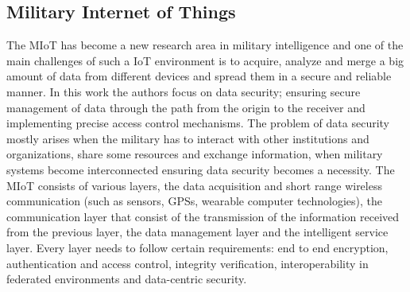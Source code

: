 \subsection{Military Internet of Things}
The MIoT has become a new research area in military intelligence and one of the main challenges of such a IoT environment is to acquire, analyze and merge a big amount of data from different devices and spread them in a secure and reliable manner. 
In this work \cite{s24185863} the authors focus on data security; ensuring secure management of data through the path from the origin to the receiver and implementing precise access control mechanisms.
The problem of data security mostly arises when the military has to interact with other institutions and organizations, share some resources and exchange information, when military systems become interconnected ensuring data security becomes a necessity.
The MIoT consists of various layers, the data acquisition and short range wireless communication (such as sensors, GPSs, wearable computer technologies), the communication layer that consist of the transmission of the information received from the previous layer, the data management layer and the intelligent service layer. 
Every layer needs to follow certain requirements: end to end encryption, authentication and access control, integrity verification, interoperability in federated environments and data-centric security.